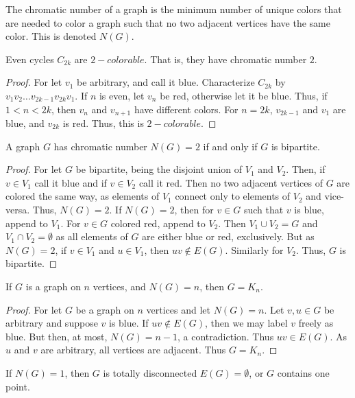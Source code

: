 \documentclass[crop=false,class=book,oneside]{standalone}
\begin{document}
\begin{definition}
The chromatic number of a graph is the minimum number of unique colors that are needed to color a graph such that no two adjacent vertices have the same color. This is denoted $N(G)$.
\end{definition}
\begin{theorem}
Even cycles $C_{2k}$ are $2-colorable$. That is, they have chromatic number $2$.
\end{theorem}
\begin{proof}
For let $v_1$ be arbitrary, and call it blue. Characterize $C_{2k}$ by $v_1 v_2 \hdots v_{2k-1}v_{2k} v_1$. If $n$ is even, let $v_n$ be red, otherwise let it be blue. Thus, if $1<n<2k$, then $v_n$ and $v_{n+1}$ have different colors. For $n=2k$, $v_{2k-1}$ and $v_1$ are blue, and $v_{2k}$ is red. Thus, this is $2-colorable$.
\end{proof}
\begin{theorem}
A graph $G$ has chromatic number $N(G)=2$ if and only if $G$ is bipartite.
\end{theorem}
\begin{proof}
For let $G$ be bipartite, being the disjoint union of $V_1$ and $V_2$. Then, if $v\in V_1$ call it blue and if $v\in V_2$ call it red. Then no two adjacent vertices of $G$ are colored the same way, as elements of $V_1$ connect only to elements of $V_2$ and vice-versa. Thus, $N(G)=2$. If $N(G)=2$, then for $v\in G$ such that $v$ is blue, append to $V_1$. For $v\in G$ colored red, append to $V_2$. Then $V_1\cup V_2 = G$ and $V_1\cap V_2 = \emptyset$ as all elements of $G$ are either blue or red, exclusively. But as $N(G)=2$, if $v\in V_1$ and $u\in V_1$, then $uv\notin E(G)$. Similarly for $V_2$. Thus, $G$ is bipartite.
\end{proof}
\begin{theorem}
If $G$ is a graph on $n$ vertices, and $N(G) = n$, then $G= K_n$.
\end{theorem}
\begin{proof}
For let $G$ be a graph on $n$ vertices and let $N(G) = n$. Let $v,u\in G$ be arbitrary and suppose $v$ is blue. If $uv\notin E(G)$, then we may label $v$ freely as blue. But then, at most, $N(G)=n-1$, a contradiction. Thus $uv\in E(G)$. As $u$ and $v$ are arbitrary, all vertices are adjacent. Thus $G=K_n$.
\end{proof}
\begin{corollary}
If $N(G) = 1$, then $G$ is totally disconnected $E(G)=\emptyset$, or $G$ contains one point.
\end{corollary}
\end{document}
